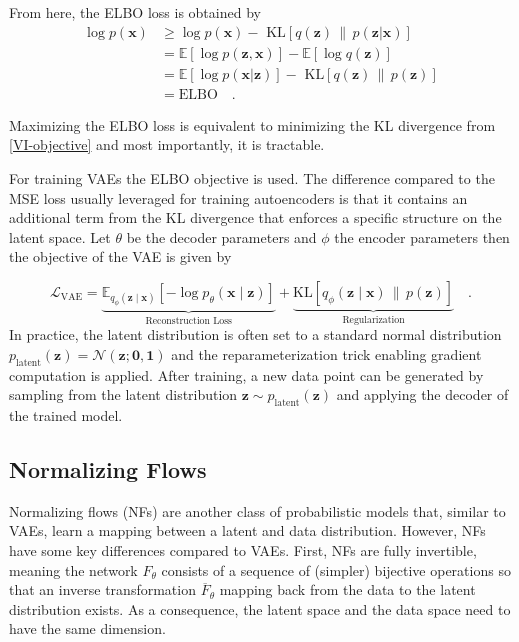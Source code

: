 From here, the ELBO loss is obtained by
\begin{align}
    \log p(\textbf{x}) &\geq \log p(\textbf{x}) - \text{ KL} \left[ q(\textbf{z}) \,\|\, p(\textbf{z}|\textbf{x})\right] \\ 
    &= \mathbb{E}\left[ \log p(\textbf{z},\textbf{x}) \right] -\mathbb{E}\left[ \log q(\textbf{z}) \right] \\
    &=\mathbb{E}\left[ \log p(\textbf{x}| \textbf{z}) \right] - \text{ KL} \left[ q(\textbf{z}) \,\|\, p(\textbf{z})\right] \\
    &= \text{ELBO} \quad.
\end{align}


Maximizing the \gls{ELBO} loss is equivalent to minimizing the \gls{KL} divergence from \ref{VI-objective} and most importantly, it is tractable. 

For training \gls{VAE}s the \gls{ELBO} objective is used. The difference compared to the \gls{MSE} loss usually leveraged for training autoencoders is that it contains an additional term from the \gls{KL} divergence that enforces a specific structure on the latent space. Let $\theta$ be the decoder parameters and $\phi$ the encoder parameters then the objective of the \gls{VAE} is given by 

 
 \begin{equation}
     \mathcal{L}_{\text{VAE}} = \underbrace{
\mathbb{E}_{q_\phi(\textbf{z} \mid \textbf{x})}\left[-\log p_\theta(\textbf{x} \mid \textbf{z})\right]
}_{\text{Reconstruction Loss}}
+ 
\underbrace{
\text{KL}\left[q_\phi(\textbf{z} \mid \textbf{x}) \,\|\, p(\textbf{z})\right]
}_{\text{Regularization}} \quad.
 \end{equation}
In practice, the latent distribution is often set to a standard normal distribution $p_{\text{latent}}(\textbf{z}) = \mathcal{N}(\textbf{z};\textbf{0},\textbf{1})$ and the reparameterization trick \cite{VAE} enabling gradient computation is applied.
After training, a new data point can be generated by sampling from the latent distribution \mbox{$\textbf{z} \sim p_{\text{latent}}(\textbf{z})$} and applying the decoder of the trained model.


\subsection{Normalizing Flows}
Normalizing flows (\gls{NF}s) \cite{NormalizingFlow} are another class of probabilistic models that, similar to \gls{VAE}s, learn a mapping between a latent and data distribution. However, \gls{NF}s have some key differences compared to \gls{VAE}s. First, \gls{NF}s are fully invertible, meaning the network $F_\theta$ consists of a sequence of (simpler) bijective operations so that an inverse transformation $\overline{F}_\theta$ mapping back from the data to the latent distribution exists. As a consequence, the latent space and the data space need to have the same dimension. 

